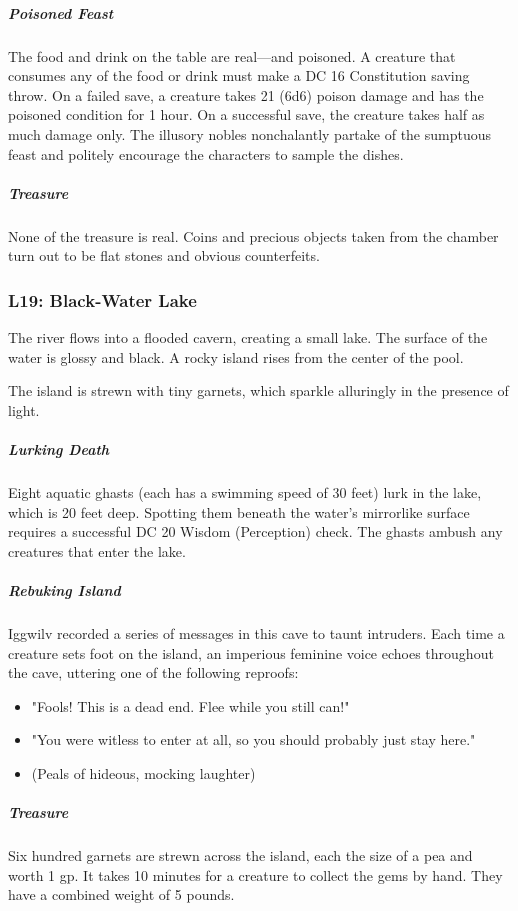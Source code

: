 \documentclass[10pt,a4paper,twoside,bg=print,twocolumn,openany,nodeprecatedcode]{dndbook}
\begin{document}
\subparagraph{Poisoned Feast}
The food and drink on the table are real—and poisoned. A creature that consumes any of the food or drink must make a DC 16 Constitution saving throw. On a failed save, a creature takes 21 (6d6) poison damage and has the poisoned condition for 1 hour. On a successful save, the creature takes half as much damage only. The illusory nobles nonchalantly partake of the sumptuous feast and politely encourage the characters to sample the dishes.

\subparagraph{Treasure}
None of the treasure is real. Coins and precious objects taken from the chamber turn out to be flat stones and obvious counterfeits.

\subsubsection{L19: Black-Water Lake}
\begin{DndReadAloud}{}
The river flows into a flooded cavern, creating a small lake. The surface of the water is glossy and black. A rocky island rises from the center of the pool.

\end{DndReadAloud}

The island is strewn with tiny garnets, which sparkle alluringly in the presence of light.

\subparagraph{Lurking Death}
Eight aquatic ghasts (each has a swimming speed of 30 feet) lurk in the lake, which is 20 feet deep. Spotting them beneath the water's mirrorlike surface requires a successful DC 20 Wisdom (Perception) check. The ghasts ambush any creatures that enter the lake.

\subparagraph{Rebuking Island}
Iggwilv recorded a series of messages in this cave to taunt intruders. Each time a creature sets foot on the island, an imperious feminine voice echoes throughout the cave, uttering one of the following reproofs:


\begin{itemize}
\item "Fools! This is a dead end. Flee while you still can!"
\item "You were witless to enter at all, so you should probably just stay here."
\item (Peals of hideous, mocking laughter)
\end{itemize}

\subparagraph{Treasure}
Six hundred garnets are strewn across the island, each the size of a pea and worth 1 gp. It takes 10 minutes for a creature to collect the gems by hand. They have a combined weight of 5 pounds.
\end{document}
